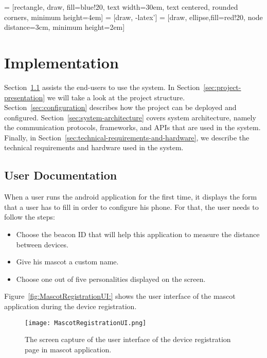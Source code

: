  = [rectangle, draw, fill=blue!20,
text width=30em, text centered, rounded corners, minimum height=4em]
 = [draw, -latex']
 = [draw, ellipse,fill=red!20, node distance=3cm,
minimum height=2em]

\chapter{Implementation}
\label{ch:implementation}
Section~\ref{sec:user-documentation} assists the end-users to use the system.
In Section~\ref{sec:project-presentation} we will take a look at the project structure.
Section~\ref{sec:configuration} describes how the project can be deployed and configured.
Section~\ref{sec:system-architecture} covers system architecture, namely the
communication protocols, frameworks, and APIs that are used in the system.
Finally, in Section~\ref{sec:technical-requirements-and-hardware}, we describe the technical
requirements and hardware used in the system.

\section{User Documentation}
\label{sec:user-documentation}
When a user runs the android application for the first time, it displays the form that a
user has to fill in order to configure his phone.
For that, the user needs to follow the steps:

\begin{itemize}
    \item Choose the beacon ID that will help this application to measure the distance between devices.
    \item Give his mascot a custom name.
    \item Choose one out of five personalities displayed on the screen.
\end{itemize}

Figure~\ref{fig:MascotRegistrationUI:} shows the user interface of the mascot application during the device registration.
\begin{figure}[hbt!]
    \centering
    \texttt{[image: MascotRegistrationUI.png]}
    \caption{The screen capture of the user interface of the device registration page in mascot application.}
    \label{fig:MascotRegistrationUI}
\end{figure}

